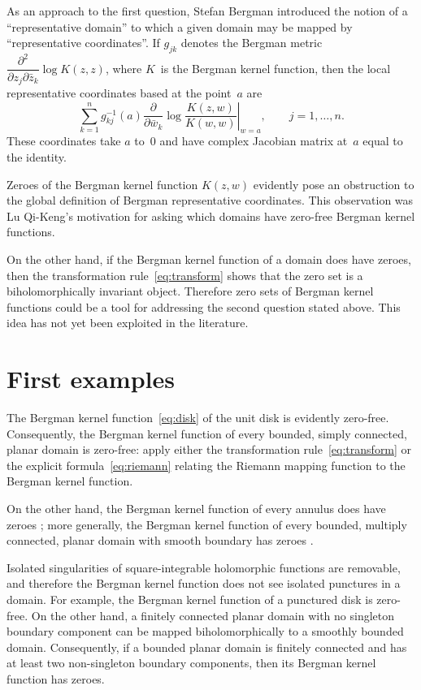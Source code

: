\documentclass[12pt]{amsart}
\theoremstyle{definition}
\begin{document}
As an approach to the first question, Stefan Bergman introduced
the notion of a ``representative domain'' to which a given domain
may be mapped by ``representative coordinates''.  If \(g_{jk}\)
denotes the Bergman metric
\begin{math}
\dfrac{\partial^2}{\partial z_j\partial\bar  z_k}\log K(z,z)
\end{math},
where \(K\)~is the Bergman kernel function, then the local
representative coordinates based at the point~\(a\) are
\begin{equation*}
\sum_{k=1}^n
g_{kj}^{-1}(a) \left. \frac{\partial}{\partial \bar w_k} \log
\frac{K(z,w)}{K(w,w)} \right|_{w=a}, \qquad j=1, \dotsc, n.
\end{equation*}
These coordinates take \(a\) to~\(0\) and have complex Jacobian
matrix at~\(a\) equal to the identity.

Zeroes of the Bergman kernel function \(K(z,w)\) evidently pose
an obstruction to the global definition of Bergman representative
coordinates. This observation was Lu Qi-Keng's motivation for
asking which domains have zero-free Bergman kernel functions.

On the other hand, if the Bergman kernel function of a domain
does have zeroes, then the transformation
rule~\eqref{eq:transform} shows that the zero set is a
biholomorphically invariant object. Therefore zero sets of
Bergman kernel functions could be a tool for addressing the
second question stated above. This idea has not yet been
exploited in the literature.

\section{First examples}
\label{first}
The Bergman kernel function~\eqref{eq:disk} of the unit disk is
evidently zero-free.  Consequently, the Bergman kernel function
of every bounded, simply connected, planar domain is zero-free:
apply either the transformation rule~\eqref{eq:transform} or the
explicit formula~\eqref{eq:riemann} relating the Riemann mapping
function to the Bergman kernel function.

On the other hand, the Bergman kernel function of every annulus
does have zeroes \cite{rosenthal,skwar}; more generally, the
Bergman kernel function of every bounded, multiply connected,
planar domain with smooth boundary has zeroes \cite{suitayamada}.

Isolated singularities of square-integrable holomorphic functions
are removable, and therefore the Bergman kernel function does not
see isolated punctures in a domain.  For example, the Bergman
kernel function of a punctured disk is zero-free. On the other
hand, a finitely connected planar domain with no singleton
boundary component can be mapped biholomorphically to a smoothly
bounded domain.  Consequently, if a bounded planar domain is
finitely connected and has at least two non-singleton boundary
components, then its Bergman kernel function has zeroes.
\end{document}
